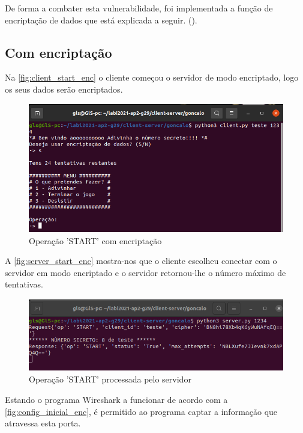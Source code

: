 \documentclass{report}
\begin{document}
De forma a combater esta vulnerabilidade, foi implementada a função de encriptação de dados que está explicada a seguir. ().

\subsection{Com encriptação}
\label{ssec:wireshark_encrypt}

Na \autoref{fig:client_start_enc} o cliente começou o servidor de modo encriptado, logo os seus dados serão encriptados.

\begin{figure}[!h]
\center 
\includegraphics[height=160pt]{img/encripted/client_start.png}
\caption{Operação 'START' com encriptação}
\label{fig:client_start_enc}
\end{figure}

A \autoref{fig:server_start_enc} mostra-nos que o cliente escolheu conectar com o servidor em modo encriptado e o servidor retornou-lhe o número máximo de tentativas.

\begin{figure}[!h]
\center 
\includegraphics[height=90pt]{img/encripted/server_start.png}
\caption{Operação 'START' processada pelo servidor}
\label{fig:server_start_enc}
\end{figure}

Estando o programa Wireshark a funcionar de acordo com a \autoref{fig:config_inicial_enc}, é permitido ao programa captar a informação que atravessa esta porta. 
\end{document}
